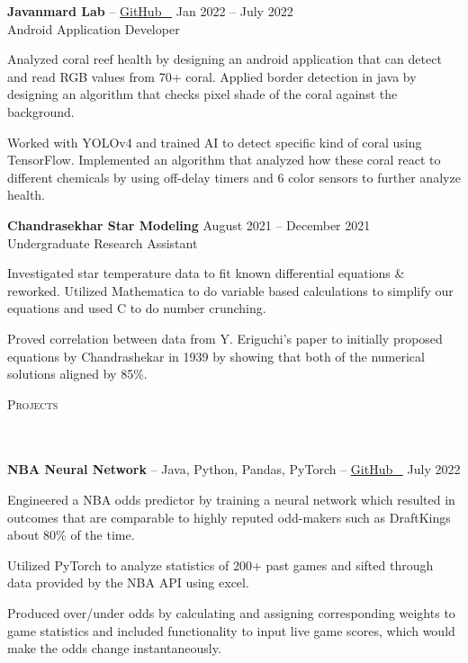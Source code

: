 \documentclass{article}
\newcommand{\header}[1]{{
\hspace*{0pt}\vspace*{6pt} \textsc{#1}} \vspace*{-6pt} 
\lineunder
}
\newcommand{\lineunder}{
\vspace*{-8pt} \\ \hspace*{-3pt} 
\hrulefill \\
}
\newcommand{\employer}[4]{{
\vspace*{2pt}%
\textbf{#1} #2 \hfill #3\\ #4 \vspace*{2pt}}
}
\newcommand{\project}[3]{{
\vspace*{2pt}%
\textbf{#1} #2 \hfill #3\vspace*{2pt}}
}
\renewcommand{\labelitemii}{
$\vcenter{\hbox{\tiny$\bullet$}}$\hspace*{-3pt}
}
\newenvironment{bullet-list-minor}{
\begin{list}{\labelitemii}{\setlength\leftmargin{15pt} 
\topsep 0pt \itemsep -2pt}}{\vspace*{4pt}\end{list}
}
\begin{document}
    \employer{Javanmard Lab}
    {-- \href{https://github.com/akhilvreddy/Coral-Reef}{GitHub \faGithub\ }}{Jan 2022 -- July 2022}{Android Application Developer}
	\begin{bullet-list-minor}
	\item Analyzed coral reef health by designing an android application that can detect and read RGB values from 70+ coral. Applied border detection in java by designing an algorithm that checks pixel shade of the coral against the background.
	\item Worked with YOLOv4 and trained AI to detect specific kind of coral using TensorFlow. Implemented an algorithm that analyzed how these coral react to different chemicals by using off-delay timers and 6 color sensors to further analyze health.
    \end{bullet-list-minor}
    
    \employer{Chandrasekhar Star Modeling}
    {}{August 2021 -- December 2021}{Undergraduate Research Assistant}
	\begin{bullet-list-minor}
	\item Investigated star temperature data to fit known differential equations \& reworked. Utilized Mathematica to do variable based calculations to simplify our equations and used C to do number crunching.
	\item Proved correlation between data from Y. Eriguchi’s paper to initially proposed equations by Chandrashekar in 1939 by showing that both of the numerical solutions aligned by 85\%. 
    \end{bullet-list-minor}


\vspace*{4pt}%
\header{Projects}
    \project{NBA Neural Network}{-- Java, Python, Pandas, PyTorch -- \href{https://github.com/akhilvreddy/NBANeuralNetwork}{GitHub \faGithub\ }}{July 2022}
    \begin{bullet-list-minor}
    \item Engineered a NBA odds predictor by training a neural network which resulted in outcomes that are comparable to highly reputed odd-makers such as DraftKings about 80\% of the time.
    \item Utilized PyTorch to analyze statistics of 200+ past games and sifted through data provided by the NBA API using excel. 
    \item Produced over/under odds by calculating and assigning corresponding weights to game statistics and included functionality to input live game scores, which would make the odds change instantaneously. 
    \end{bullet-list-minor}
\end{document}
